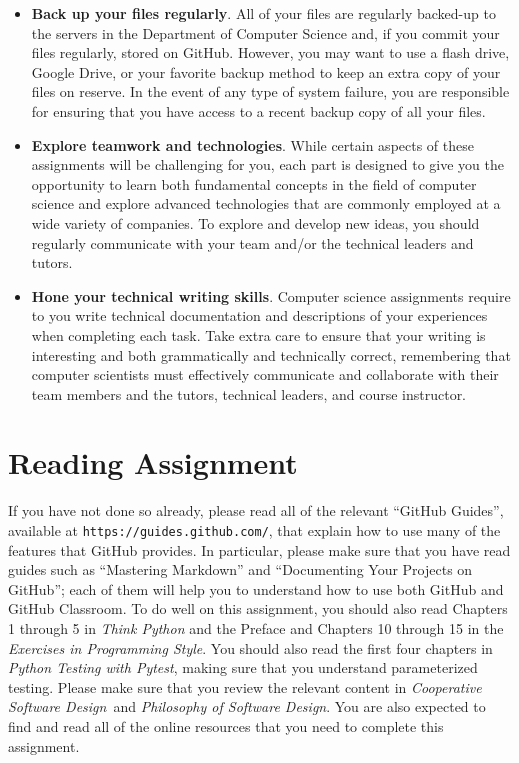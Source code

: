 \documentclass[11pt]{article}
\newcommand{\cooperative}{{\em Cooperative Software Design\/}}
\newcommand{\philosophy}{{\em Philosophy of Software Design\/}}
\newcommand{\pytest}{{\em Python Testing with Pytest\/}}
\newcommand{\url}[1]{\lstinline{#1}}
\begin{document}
\begin{itemize}
\item {\bf Back up your files regularly}. All of your files are regularly
  backed-up to the servers in the Department of Computer Science and, if you
  commit your files regularly, stored on GitHub. However, you may want to use a
  flash drive, Google Drive, or your favorite backup method to keep an extra
  copy of your files on reserve. In the event of any type of system failure,
  you are responsible for ensuring that you have access to a recent backup copy
  of all your files.

\item {\bf Explore teamwork and technologies}. While certain aspects of these
  assignments will be challenging for you, each part is designed to give you the
  opportunity to learn both fundamental concepts in the field of computer
  science and explore advanced technologies that are commonly employed at a wide
  variety of companies. To explore and develop new ideas, you should regularly
  communicate with your team and/or the technical leaders and tutors.

\item {\bf Hone your technical writing skills}. Computer science assignments
  require to you write technical documentation and descriptions of your
  experiences when completing each task. Take extra care to ensure that your
  writing is interesting and both grammatically and technically correct,
  remembering that computer scientists must effectively communicate and
  collaborate with their team members and the tutors, technical leaders, and
  course instructor.

\end{itemize}

\section*{Reading Assignment}

If you have not done so already, please read all of the relevant ``GitHub
Guides'', available at \url{https://guides.github.com/}, that explain how to use
many of the features that GitHub provides. In particular, please make sure that
you have read guides such as ``Mastering Markdown'' and ``Documenting Your
Projects on GitHub''; each of them will help you to understand how to use both
GitHub and GitHub Classroom. To do well on this assignment, you should also read
Chapters 1 through 5 in {\em Think Python\/} and the Preface and Chapters 10
through 15 in the {\em Exercises in Programming Style\/}.
%
You should also read the first four chapters in \pytest, making sure that you
understand parameterized testing.
%
Please make sure that you review the relevant content in \cooperative~and
\philosophy.
%
You are also expected to find and read all of the online resources that you need
to complete this assignment.
\end{document}
